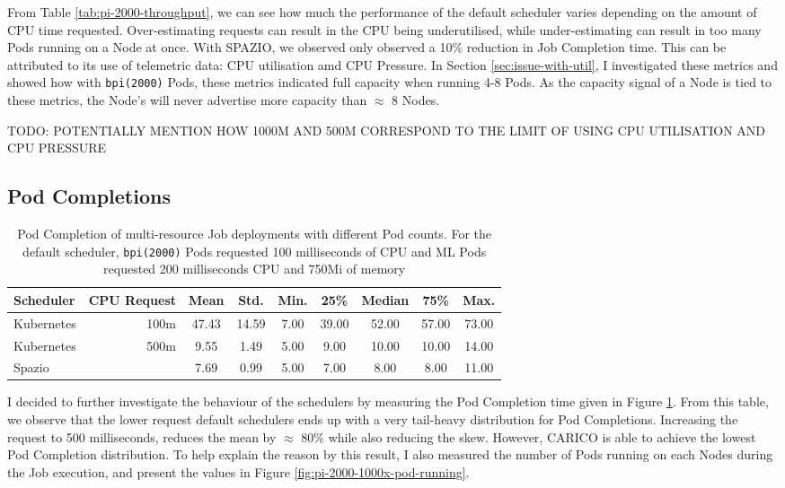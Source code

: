 From Table \ref{tab:pi-2000-throughput}, we can see how much the performance of
the default scheduler varies depending on the amount of CPU time requested.
Over-estimating requests can result in the CPU being underutilised, while
under-estimating can result in too many Pods running on a Node at once. With
SPAZIO, we observed only observed a 10\% reduction in Job Completion time. This
can be attributed to its use of telemetric data: CPU utilisation amd CPU
Pressure. In Section \ref{sec:issue-with-util}, I investigated these metrics and
showed how with \texttt{bpi(2000)} Pods, these metrics indicated full capacity
when running 4-8 Pods. As the capacity signal of a Node is tied to these
metrics, the Node's will never advertise more capacity than $\approx$ 8 Nodes.

TODO: POTENTIALLY MENTION HOW 1000M AND 500M CORRESPOND TO THE LIMIT OF USING
CPU UTILISATION AND CPU PRESSURE

\subsection{Pod Completions}
\begin{table}[H]
\centering
    \begin{tabular}{|l|r|c|c|c|c|c|c|c|}
    \hline
        \bfseries Scheduler & \bfseries CPU Request & \bfseries Mean & \bfseries Std. &
        \bfseries Min. & \bfseries 25\% & \bfseries Median & \bfseries 75\% & \bfseries Max. \\
    \hline
        Kubernetes & 100m & 47.43 & 14.59 & 7.00 & 39.00 & 52.00 & 57.00 & 73.00
        \\
        Kubernetes & 500m & 9.55 & 1.49 & 5.00 & 9.00 & 10.00 & 10.00 & 14.00
        \\
        Spazio & & 7.69 & 0.99 & 5.00 & 7.00 & 8.00 & 8.00 & 11.00 \\
    \hline
    \end{tabular}
    \caption{Pod Completion of multi-resource Job deployments with different Pod
    counts. For the default scheduler, \texttt{bpi(2000)} Pods requested 100
    milliseconds of CPU and ML Pods requested 200 milliseconds CPU and 750Mi of
    memory}
    \label{tab:cpu-pod-completions}
\end{table}
I decided to further investigate the behaviour of the schedulers by measuring
the Pod Completion time given in Figure \ref{tab:cpu-pod-completions}. From this
table, we observe that the lower request default schedulers ends up with a very
tail-heavy distribution for Pod Completions. Increasing the request to 500
milliseconds, reduces the mean by $\approx$ 80\% while also reducing the skew.
However, CARICO is able to achieve the lowest Pod Completion distribution. To
help explain the reason by this result, I also measured the number of Pods
running on each Nodes during the Job execution, and present the values in Figure
\ref{fig:pi-2000-1000x-pod-running}.

